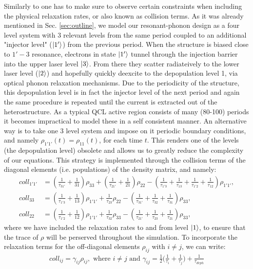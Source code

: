 \documentclass[10pt,english,fleqn]{article}%
\begin{document}
Similarly to \cite{bidegaray2001} one has to make sure to observe certain
constraints when including the physical relaxation rates, or also known as collision terms. As it was already mentioned in Sec. \ref{sec:outline}, 
we model our resonant-phonon design as a four level system with 3 relevant levels from the same period coupled to an additional "injector level" ($\Ket{1'}$) 
from the previous period. When the structure is biased close to $1'-3$ resonance, electrons in state $\Ket{1'}$ tunnel through the injection barrier into the upper
laser level $\Ket{3}$. From there they scatter radiateively to the lower laser level ($\Ket{2}$) and hopefully quickly deexcite to the depopulation level 1, via 
optical phonon relaxation mechanisms. Due to the periodicity of the structure, this depopulation level is in fact the injector level of the next period and again 
the same procedure is repeated until the current is extracted out of the heterostructure. As a typical QCL active region consists of many (80-100) 
periods it becomes impractical to model these in a self consistent manner. An alternative way is to take one 3 level system and impose on it periodic 
boundary conditions, and namely $\rho_{1'1'}(t) = \rho_{11}(t)$, for each time $t$. This renders one of the levels (the depopulation level) obsolete and allows
us to greatly reduce the complexity of our equations. This strategy is implemented through the collision terms of the diagonal elements (i.e. populations) of the
density matrix, and namely:
\begin{align}
 coll_{1'1'} &= (\frac{1}{\tau_{31'}}  + \frac{1}{31})\rho_{33} + (\frac{1}{\tau_{21'}}  + \frac{1}{21})\rho_{22}
 - (\frac{1}{\tau_{1'3}} + \frac{1}{\tau_{13}} + \frac{1}{\tau_{1'2}} + \frac{1}{\tau_{12}})\rho_{1'1'}, \\
 coll_{33} &= (\frac{1}{\tau_{1'3}}  + \frac{1}{13})\rho_{1'1'} + \frac{1}{\tau_{23}}\rho_{22}
 - (\frac{1}{\tau_{31'}} + \frac{1}{\tau_{32}} + \frac{1}{\tau_{31}} )\rho_{33}, \\
 coll_{22} &= (\frac{1}{\tau_{1'2}}  + \frac{1}{12})\rho_{1'1'} + \frac{1}{\tau_{32}}\rho_{33}
 - (\frac{1}{\tau_{21'}} + \frac{1}{\tau_{23}} + \frac{1}{\tau_{21}} )\rho_{33}, 
\end{align}
where we have included the relaxation rates to and from level $\Ket{1}$, to ensure that the trace of $\rho$ will be perserved throughout the simulation.
To incorporate the relaxation terms for the off-diagonal elements $\rho_{ij}$ with $i \neq j$, we can write: 
\begin{align}
coll_{ij} = \gamma_{ij} \rho_{ij} , \text{ where } i \neq j \text{ and } \gamma_{ij} = \frac{1}{2} \big( \frac{1}{\tau_i} + 
\frac{1}{\tau_j} \big) + \frac{1}{\tau_{deph}}
\end{align}
\end{document}
